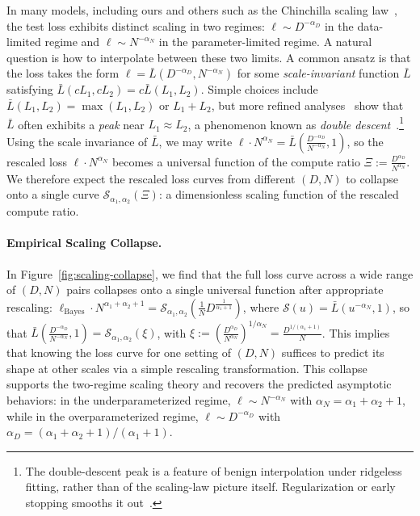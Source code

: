 \documentclass[11pt]{article}
\theoremstyle{plain}
\theoremstyle{definition}
\theoremstyle{remark}
\newcommand{\JSCheck}[1]{#1}
\begin{document}
In many models, including ours and others such as the Chinchilla scaling law~\citep{Hoffmann2022Chinchilla}, the test loss exhibits distinct scaling in two regimes: \( \ell \sim D^{-\alpha_D} \) in the data-limited regime and \( \ell \sim N^{-\alpha_N} \) in the parameter-limited regime. A natural question is how to interpolate between these two limits. A common ansatz is that the loss takes the form $\ell = \bar{L}(D^{-\alpha_D}, N^{-\alpha_N})$
for some \emph{scale-invariant} function \( \bar{L} \) satisfying \( \bar{L}(cL_1, cL_2) = c \bar{L}(L_1, L_2) \). Simple choices include \( \bar{L}(L_1, L_2) = \max(L_1, L_2) \) or \( L_1 + L_2 \), but more refined analyses~\citep{Maloney2022SolvableScaling,zhang2024largenfieldtheory} show that \( \bar{L} \) often exhibits a \emph{peak} near \( L_1 \approx L_2 \), a phenomenon known as \emph{double descent}~\citep{belkin2019reconciling, hastie2022surprises}.\footnote{\JSCheck{The double-descent peak is a feature of benign interpolation under ridgeless fitting, rather than of the scaling-law picture itself. Regularization or early stopping smooths it out~\citep{hastie2022surprises}.}} Using the scale invariance of \( \bar{L} \), we may write $\ell \cdot N^{\alpha_N} = \bar{L}\left( \frac{D^{-\alpha_D}}{N^{-\alpha_N}}, 1 \right)$,
so the rescaled loss \( \ell \cdot N^{\alpha_N} \) becomes a universal function of the compute ratio $\Xi := \frac{D^{\alpha_D}}{N^{\alpha_N}}$. \JSCheck{We therefore expect the rescaled loss curves from different \( (D, N) \)  to collapse onto a single curve \( \mathcal{S}_{\alpha_1, \alpha_2}(\Xi) \):  a dimensionless scaling function of the rescaled compute ratio.}

\vspace{-2mm}

\paragraph{Empirical Scaling Collapse.} In Figure~\ref{fig:scaling-collapse}, we find that the full loss curve across a wide range of \( (D, N) \) pairs collapses onto a single universal function after appropriate rescaling: $\ell_{\mathrm{Bayes}} \cdot N^{\alpha_1 + \alpha_2 + 1} = 
\mathcal{S}_{\alpha_1, \alpha_2}\left( \frac{1}{N} D^{\frac{1}{\alpha_1 + 1}} \right)$, where $\mathcal{S}(u)=\bar{L}(u^{-\alpha_N},1)$, so that
\JSCheck{$\bar{L}(\frac{D^{-\alpha_D}}{N^{-\alpha_N}},1)
=\mathcal{S}_{\alpha_1,\alpha_2}\!\left(\xi\right)$, with $\xi := \left(\frac{D^{\alpha_D}}{N^{\alpha_N}}\right)^{1/\alpha_N}
=\frac{D^{1/(\alpha_1+1)}}{N}$}. This implies that knowing the loss curve for one setting of \( (D, N) \) suffices to predict its shape at other scales via a simple rescaling transformation. \JSCheck{This collapse supports the two-regime scaling theory and recovers the predicted asymptotic behaviors: in the underparameterized regime, \( \ell \sim N^{-\alpha_N} \) with \( \alpha_N=\alpha_1+\alpha_2+1 \), while in the overparameterized regime, \( \ell \sim D^{-\alpha_D} \) with \( \alpha_D=(\alpha_1+\alpha_2+1)/(\alpha_1+1) \).}
\end{document}
